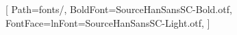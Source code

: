 \setlength\parindent{4ex}

[
    Path=fonts/,
    BoldFont=SourceHanSansSC-Bold.otf,
    FontFace={l}{n}{Font=SourceHanSansSC-Light.otf},
]
